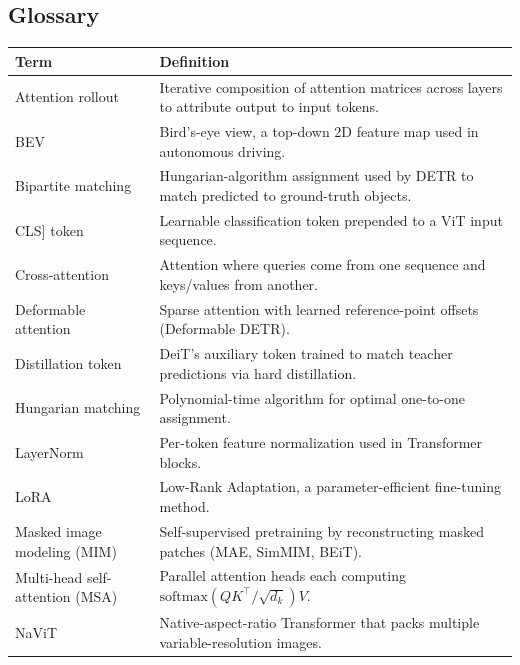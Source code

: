 \subsection{Glossary}\label{glossary}

{\def\LTcaptype{none} %
\begin{longtable}[]{@{}
  >{\raggedright\arraybackslash}p{}
  >{\raggedright\arraybackslash}p{}@{}}
\toprule\noalign{}
\begin{minipage}[b]{\linewidth}\raggedright
Term
\end{minipage} & \begin{minipage}[b]{\linewidth}\raggedright
Definition
\end{minipage} \\
\midrule\noalign{}
\endhead
\bottomrule\noalign{}
\endlastfoot
Attention rollout & Iterative composition of attention matrices across layers to attribute output to input tokens. \\
BEV & Bird's-eye view, a top-down 2D feature map used in autonomous driving. \\
Bipartite matching & Hungarian-algorithm assignment used by DETR to match predicted to ground-truth objects. \\
{[}CLS{]} token & Learnable classification token prepended to a ViT input sequence. \\
Cross-attention & Attention where queries come from one sequence and keys/values from another. \\
Deformable attention & Sparse attention with learned reference-point offsets (Deformable DETR). \\
Distillation token & DeiT's auxiliary token trained to match teacher predictions via hard distillation. \\
Hungarian matching & Polynomial-time algorithm for optimal one-to-one assignment. \\
LayerNorm & Per-token feature normalization used in Transformer blocks. \\
LoRA & Low-Rank Adaptation, a parameter-efficient fine-tuning method. \\
Masked image modeling (MIM) & Self-supervised pretraining by reconstructing masked patches (MAE, SimMIM, BEiT). \\
Multi-head self-attention (MSA) & Parallel attention heads each computing \(\mathrm{softmax}(QK^\top / \sqrt{d_k}) V\). \\
NaViT & Native-aspect-ratio Transformer that packs multiple variable-resolution images. \\

\end{longtable}}
